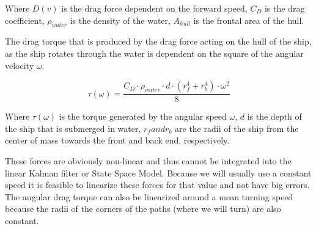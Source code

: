 Where $D(v)$ is the drag force dependent on the forward speed, $C_{D}$ is the drag coefficient, $\rho_{water}$ is the density of the water, $A_{hull}$ is the frontal area of the hull. 

The drag torque that is produced by the drag force acting on the hull of the ship, as the ship rotates through the water is dependent on the square of the angular velocity $ \omega $.

\[ \tau(\omega) = \frac{C_{D} \cdot \rho_{water} \cdot d \cdot (r_{f}^{4} + r_{b}^{4}) \cdot \omega^{2}}{8} \]

Where $ \tau(\omega) $ is the torque generated by the angular speed $ \omega $, $ d  $ is the depth of the ship that is submerged in water, $ r_{f} and r_{b} $ are the radii of the ship from the center of mass towards the front and back end, respectively.

These forces are obviously non-linear and thus cannot be integrated into the linear Kalman filter or State Space Model. Because we will usually use a constant speed it is feasible to linearize these forces for that value and not have big errors. The angular drag torque can also be linearized around a mean turning speed because the radii of the corners of the paths (where we will turn) are also constant.



